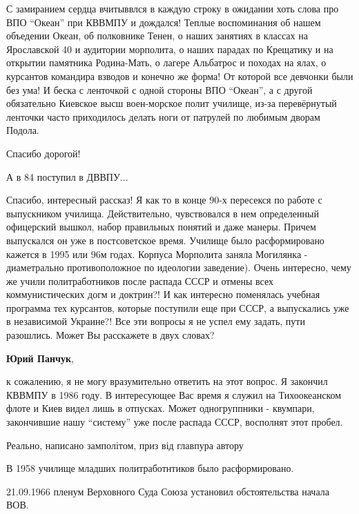 \begin{itemize}

С замиранием сердца вчитыввлся в каждую строку в ожидании хоть слова про ВПО
\enquote{Океан} при КВВМПУ и дождался! Теплые воспоминания об нашем объедении
Океан, об полковнике Тенен, о наших занятиях в классах на Ярославской 40 и
аудитории морполита, о наших парадах по Крещатику и на открытии памятника
Родина-Мать, о лагере Альбатрос и походах на ялах, о курсантов командира
взводов и конечно же форма! От которой все девчонки были без ума! И беска с
ленточкой с одной стороны ВПО \enquote{Океан}, а с другой обязательно Киевское высш
воен-морское полит училище, из-за перевёрнутый ленточки часто приходилось
делать ноги от патрулей по любимым дворам Подола.

Спасибо дорогой!

А в 84 поступил в ДВВПУ...


Спасибо, интересный рассказ! Я как то в конце 90-х пересекся по работе с
выпускником училища. Действительно, чувствовался в нем определенный офицерский
вышкол, набор правильных понятий и даже манеры. Причем выпускался он уже в
постсоветское время. Училище было расформировано кажется в 1995 или 96м годах.
Корпуса Морполита заняла Могилянка - диаметрально противоположное по идеологии
заведение). Очень интересно, чему же учили политработников после распада СССР и
отмены всех коммунистических догм и доктрин?! И как интересно поменялась
учебная программа тех курсантов, которые поступили еще при СССР, а выпускались
уже в независимой Украине?! Все эти вопросы я не успел ему задать, пути
разошлись. Может Вы расскажете в двух словах?

\begin{itemize} %
\textbf{Юрий Панчук}, 

к сожалению, я не могу вразумительно ответить на этот вопрос. Я закончил КВВМПУ
в 1986 году. В интересующее Вас время я служил на Тихоокеанском флоте и Киев
видел лишь в отпусках. Может одногруппники - квумпари, закончившие нашу
\enquote{систему} уже после распада СССР, восполнят этот пробел.

\end{itemize} %

Реально, написано замполітом, приз від главпура автору


В 1958 училище младших политработнтиков было расформировано.

21.09.1966 пленум Верховного Суда Союза установил обстоятельства начала ВОВ.


\end{itemize}
